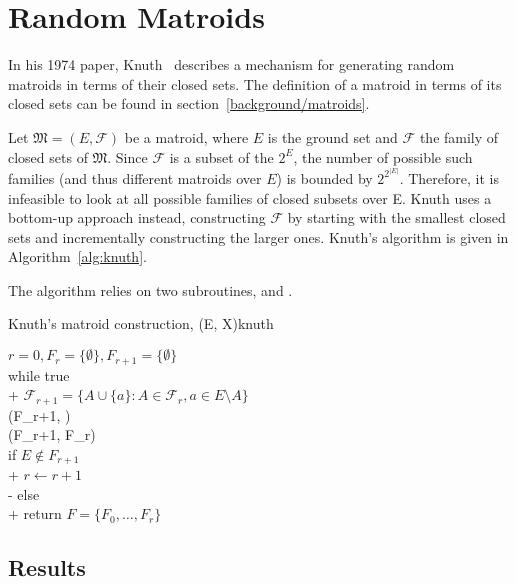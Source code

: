 \section{Random Matroids}\label{random-matroids}

In his 1974 paper, Knuth \cite{knuth-1975} describes a mechanism for generating random matroids in terms of their closed sets. The definition of a matroid in terms of its closed sets can be found in section \ref{background/matroids}.

Let $\mathfrak{M} = (E, \mathcal{F})$ be a matroid, where $E$ is the ground set and $\mathcal{F}$ the family of closed sets of $\mathfrak{M}$. Since $\mathcal{F}$ is a subset of the $2^E$, the number of possible such families (and thus different matroids over $E$) is bounded by $2^{2^{|E|}}$. Therefore, it is infeasible to look at all possible families of closed subsets over E. Knuth uses a bottom-up approach instead, constructing $\mathcal{F}$ by starting with the smallest closed sets and incrementally constructing the larger ones. Knuth's algorithm is given in Algorithm \ref{alg:knuth}.

The algorithm relies on two subroutines,  and .

\begin{algorithm}[float*=h,width=\textwidth]{Knuth's matroid construction, (E, X)}{knuth}

  \begin{pseudo}[line-height=1.1]
    $r = 0, F_r = \{ \emptyset \}, F_{r+1} = \{ \emptyset \}$ \\
    while true  \\+
    $\mathcal{F}_{r+1} = \{ A \cup \{a\} : A \in \mathcal{F}_r, a \in E \setminus A \}$\\
    (F_{r+1}, ) \\
    (F_{r+1}, F_r) \\

    if $E \not \in F_{r+1}$ \\+
    $r \leftarrow r+1$ \\-
    else \\+
    return $F = \{F_0, \ldots, F_r\}$

  \end{pseudo}

\end{algorithm}

\skelpars[8]{}


\subsection*{Results}
\begin{table*}[ht]
  \centering
  \skelcaption[1]{}
  \skeltabular[10]
\end{table*}
\skelpars[4]{}
